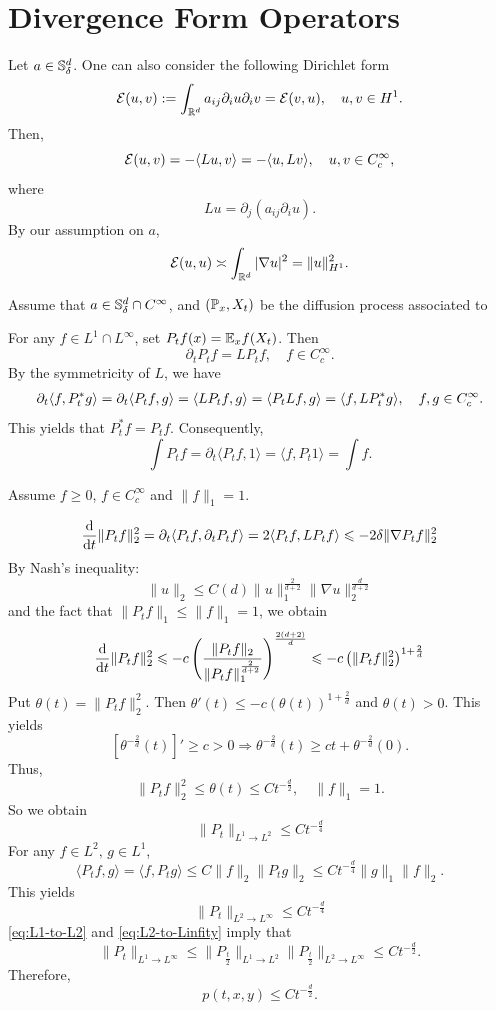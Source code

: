 \chapter{Divergence Form Operators}

Let \(a\in {\mathbb S}^d_\delta\). One can also consider the following Dirichlet form 
\[
{\mathcal E} (u, v) : = \int_{{\mathbb R}^d} a_{ij} \partial_i u \partial_i v={\mathcal E}(v,u), \quad u, v \in H^1. 
\]
Then, 
\[
{\mathcal E}(u, v) = - \langle Lu, v \rangle=-\langle u, Lv \rangle, \quad u, v \in C_c^\infty, 
\]
where
\[
L u = \partial_j (a_{ij}\partial_i u).
\]
By our assumption on \(a\), 
\[
{\mathcal E}(u,u)\asymp \int_{{\mathbb R}^d} |\nabla u|^2 = \|u\|_{H^1}^2. 
\]

\medskip
Assume that \(a\in {\mathbb S}^d_\delta\cap C^\infty\), and \(({\mathbb P}_x, X_t)\) be the diffusion process associated to 

For any \(f\in L^1\cap L^\infty\), set \(P_tf(x)={\mathbb E}_x f(X_t)\). Then 
\[
\partial_t P_t f = L P_t f, \quad f\in C^\infty_c. 
\]
By the symmetricity of \(L\), we have 
\begin{align*}
    \partial_t\langle f,P_t^*g\rangle=\partial_t\langle P_tf,g\rangle=\langle L P_t f, g\rangle= \langle P_tL f, g\rangle= \langle f, LP_t^* g\rangle, \quad f,g\in C_c^\infty.
\end{align*}
This yields that \(P_t^* f= P_tf\). Consequently, 
\[
\int P_t f = \partial_t \langle P_t f, 1\rangle = \langle f,  P_t 1 \rangle = \int f.
\]



Assume \( f \geq 0 \), \( f\in C_c^\infty \) and \(\|f\|_1 = 1\).

\[
\frac{\text{\rm{d}} }{\text{\rm{d}} t} \|P_t f\|_2^2 = \partial_t \langle P_t f, \partial_t P_t f \rangle = 2 \langle P_t f, L P_t f \rangle \leqslant -2 \delta \| \nabla P_t f \|_2^2
\]
By Nash's inequality: 
\[
\|u\|_2 \leq C(d)\| u \|_1^{\frac{2}{d+2}} \| \nabla u \|_2^{\frac{d}{d+2}}
\] 
and the fact that \(\|P_t f \|_1 \leq \|f\|_1=1\), we obtain
\[
\frac{\text{\rm{d}} }{\text{\rm{d}} t} \|P_t f\|_2^2 \leqslant -c\left( \frac{\|P_t f \|_2}{\|P_t f \|_1^{\frac{2}{d+2}}} \right)^{\frac{2(d+2)}{d}} \leqslant -c\left( \|P_t f \|_2^2 \right)^{1+\frac{2}{d}}
\]
Put \(\theta(t) = \|P_t f\|^2_2\). Then \(\theta'(t) \leq -c\left(\theta(t)\right)^{1+\frac{2}{d}}\) and \(\theta(t) > 0\). This yields 
\[
\left[ \theta^{-\frac{2}{d}}(t) \right]' \geq c> 0\Rightarrow \theta^{-\frac{2}{d}}(t) \geq ct + \theta^{-\frac{2}{d}}(0). 
\]
Thus, 
\[
\|P_t f\|_2^2 \leq \theta(t) \leq Ct^{-\frac{d}{2}}, \quad \|f\|_1 =1. 
\]
So we obtain 
\begin{equation}\label{eq:L1-to-L2}
    \|P_t\|_{L^1 \to L^2} \leq Ct^{-\frac{d}{4}}
\end{equation}
For any \( f \in L^2, \, g \in L^1 \), 
\[
    \langle P_tf, g \rangle = \langle f, P_t g \rangle \leq C\|f\|_2 \|P_t g\|_2 \leq Ct^{-\frac{d}{4}} \|g\|_1 \|f\|_2. 
\]
This yields 
\begin{equation}\label{eq:L2-to-Linfity}
    \| P_t\|_{L^2 \rightarrow L^\infty} \leq Ct^{-\frac{d}{4}}
\end{equation}
\eqref{eq:L1-to-L2} and \eqref{eq:L2-to-Linfity} imply that 
\[
    \|P_t\|_{L^1 \rightarrow L^\infty} \leq \|P_{\frac{t}{2}}\|_{L^1 \rightarrow L^2} \|P_{\frac{t}{2}}\|_{L^2 \rightarrow L^\infty} \leq Ct^{-\frac{d}{2}}. 
\]
Therefore, 
\[
    p(t,x,y)\leq Ct^{-\frac{d}{2}}. 
\]

